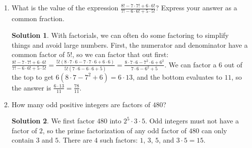 \documentclass[twocolumn]{article}
\theoremstyle{definition}
\newtheorem*{solution}{Solution}
\begin{document}
\begin{enumerate}
    \item What is the value of the expression $\frac{8! - 7 \cdot 7! + 6 \cdot 
        6!} {7! - 6 \cdot 6! + 5 \cdot 5!}$? Express your answer as a common 
        fraction.
        \begin{solution}
            With factorials, we can often do some factoring to simplify things 
            and avoid large numbers. First, the numerator and denominator have a 
            common factor of $5!$, so we can factor that out first: $\frac{8! - 
            7 \cdot 7! + 6 \cdot 6!}{7! - 6 \cdot 6! + 5 \cdot 5!} = \frac{5!(8 
            \cdot 7 \cdot 6 - 7 \cdot 7 \cdot 6 + 6 \cdot 6)}{5!(7 \cdot 6 - 6 
            \cdot 6 + 5)} = \frac{8 \cdot 7 \cdot 6 - 7^2 \cdot 6 + 6^2}{7 \cdot 
            6 - 6^2 + 5}$. We can factor a $6$ out of the top to get $6(8 \cdot 
            7 - 7^2 + 6) = 6 \cdot 13$, and the bottom evaluates to $11$, so the 
            answer is $\frac{6 \cdot 13}{11} = \frac{78}{11}$.
        \end{solution}
    \item How many odd positive integers are factors of $480$?
        \begin{solution}
            We first factor $480$ into $2^5 \cdot 3 \cdot 5$. Odd integers must 
            not have a factor of $2$, so the prime factorization of any odd 
            factor of $480$ can only contain $3$ and $5$. There are $4$ such 
            factors: $1$, $3$, $5$, and $3 \cdot 5 = 15$.
        \end{solution}
\end{enumerate}
\end{document}
